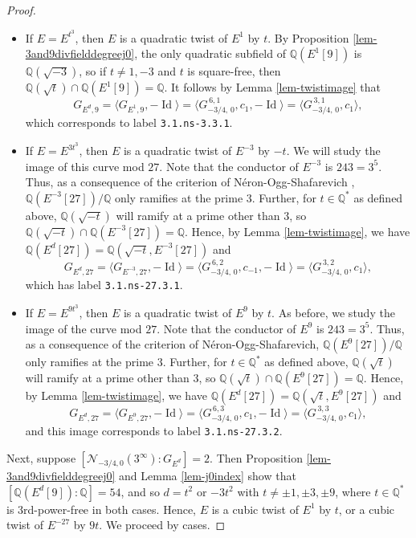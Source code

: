 \documentclass[11pt]{amsart}
\theoremstyle{definition}
\newcommand{\Q}{\mathbb Q}
\begin{document}
\begin{proof}
    \begin{itemize}
        \item If $E = E^{t^3}$, then $E$ is a quadratic twist of $E^1$ by $t$. By Proposition \ref{lem-3and9divfielddegreej0}, the only quadratic subfield of $\Q(E^1[9])$ is $\Q(\sqrt{-3})$, so if $t \neq 1, -3$ and $t$ is square-free, then $\Q(\sqrt{t}) \cap \Q(E^1[9]) = \Q$. It follows by Lemma \ref{lem-twistimage} that 
        \[ G_{E^d, 9} = \langle G_{E^1, 9}, -\operatorname{Id} \rangle
        = \langle G^{\, 6,1}_{-3/4, \, 0}, c_1, -\operatorname{Id} \rangle
        = \langle G^{\, 3,1}_{-3/4, \, 0}, c_1 \rangle, \]
        which corresponds to label \texttt{3.1.ns-3.3.1}.
    \item If $E = E^{3t^3}$, then $E$ is a quadratic twist of $E^{-3}$ by $-t$. We will study the image of this curve mod $27$.
    Note that the conductor of $E^{-3}$ is $243 = 3^5$. Thus, as a consequence of the criterion of N\'eron-Ogg-Shafarevich \cite{silverman1}, $\Q(E^{-3}[27])/\Q$ only ramifies at the prime $3$. Further, for $t \in \Q^{\ast}$ as defined above, $\Q(\sqrt{-t})$ will ramify at a prime other than $3$, so $\Q(\sqrt{-t}) \cap \Q(E^{-3}[27]) = \Q$. Hence, by Lemma \ref{lem-twistimage}, we have $\Q(E^d[27]) = \Q(\sqrt{-t},E^{-3}[27])$ and
    \[ G_{E^d, 27} = \langle G_{E^{-3}, 27}, -\operatorname{Id} \rangle = \langle G^{\, 6,2}_{-3/4, \, 0}, c_{-1}, -\operatorname{Id} \rangle
        = \langle G^{\, 3,2}_{-3/4, \, 0}, c_1 \rangle, \]
        which has label \texttt{3.1.ns-27.3.1}.
    \item If $E = E^{9t^3}$, then $E$ is a quadratic twist of $E^{9}$ by $t$. As before, we study the image of the curve mod $27$.
    Note that the conductor of $E^{9}$ is $243 = 3^5$. Thus, as a consequence of the criterion of N\'eron-Ogg-Shafarevich, $\Q(E^{9}[27])/\Q$ only ramifies at the prime $3$. Further, for $t \in \Q^{\ast}$ as defined above, $\Q(\sqrt{t})$ will ramify at a prime other than $3$, so $\Q(\sqrt{t}) \cap \Q(E^{9}[27]) = \Q$. Hence, by Lemma \ref{lem-twistimage}, we have $\Q(E^d[27]) = \Q(\sqrt{t},E^{9}[27])$ and 
        \[ G_{E^d, 27} = \langle G_{E^{9}, 27}, -\operatorname{Id} \rangle
        = \langle G^{\, 6,3}_{-3/4, \, 0}, c_{1}, -\operatorname{Id} \rangle
        = \langle G^{\, 3,3}_{-3/4, \, 0}, c_1 \rangle, \] 
        and this image corresponds to label \texttt{3.1.ns-27.3.2}.


    \end{itemize}

 Next, suppose $[\mathcal{N}_{-3/4, 0}(3^{\infty}) : G_{E^d}] = 2$. Then Proposition \ref{lem-3and9divfielddegreej0} and Lemma \ref{lem-j0index} show that $[\Q(E^d[9]) : \Q] = 54$, and so $d = t^2$ or $-3t^2$ with $t \neq \pm 1, \pm 3, \pm 9$, where $t \in \Q^{\ast}$ is 3rd-power-free in both cases. Hence, $E$ is a cubic twist of $E^1$ by $t$, or a cubic twist of $E^{-27}$ by $9t$. We proceed by cases.


\end{proof}
\end{document}
